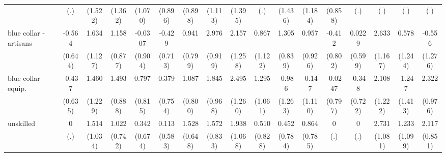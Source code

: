 {\begin{tabular}{l*{16}{c}}
                    &         (.)         &     (1.522)         &     (1.362)         &     (1.070)         &     (0.896)         &     (0.898)         &     (1.113)         &     (1.395)         &         (.)         &     (1.436)         &     (1.184)         &     (0.858)         &         (.)         &         (.)         &         (.)         &         (.)         \\
[1em]
blue collar - artisans&      -0.564         &       1.634         &       1.158         &     -0.0307         &      -0.429         &       0.941         &       2.976\sym{**} &       2.157         &       0.867         &       1.305         &       0.957         &      -0.412         &      0.0229         &       2.633\sym{*}  &       0.578         &      -0.556         \\
                    &     (0.644)         &     (1.127)         &     (0.877)         &     (0.904)         &     (0.713)         &     (0.799)         &     (0.919)         &     (1.258)         &     (1.122)         &     (0.839)         &     (0.926)         &     (0.802)         &     (0.599)         &     (1.167)         &     (1.244)         &     (1.276)         \\
[1em]
blue collar - equip.&      -0.437         &       1.460         &       1.493         &       0.797         &       0.379         &       1.087         &       1.845         &       2.495\sym{*}  &       1.295         &      -0.986         &      -0.147         &     -0.0247         &      -0.348         &       2.108         &      -1.247         &       2.322\sym{*}  \\
                    &     (0.635)         &     (1.229)         &     (0.888)         &     (0.815)         &     (0.754)         &     (0.800)         &     (0.968)         &     (1.260)         &     (1.061)         &     (1.263)         &     (1.110)         &     (0.797)         &     (0.722)         &     (1.222)         &     (1.413)         &     (0.976)         \\
[1em]
unskilled           &           0         &       1.514         &       1.022         &       0.342         &       0.113         &       1.528\sym{*}  &       1.572         &       1.938         &       0.510         &       0.452         &       0.864         &           0         &           0         &       2.731\sym{*}  &       1.233         &       2.117\sym{*}  \\
                    &         (.)         &     (1.034)         &     (0.742)         &     (0.674)         &     (0.583)         &     (0.648)         &     (0.833)         &     (1.068)         &     (0.828)         &     (0.784)         &     (0.785)         &         (.)         &         (.)         &     (1.081)         &     (1.099)         &     (0.851)         \\

\end{tabular}}
